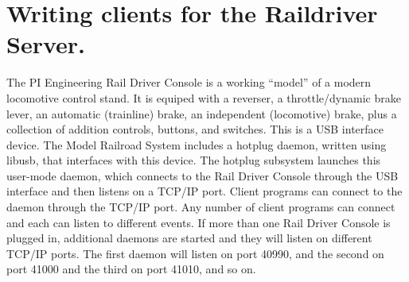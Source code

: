 
\chapter{Writing clients for the Raildriver Server.}
\label{chapt:rd:RaildriverServer}

The PI Engineering Rail Driver Console is a working ``model'' of a
modern locomotive control stand.  It is equiped with a reverser, a
throttle/dynamic brake lever, an automatic (trainline) brake, an
independent (locomotive) brake, plus a collection of addition controls,
buttons, and switches.  This is a USB interface device.  The Model
Railroad System includes a hotplug daemon, written using libusb, that
interfaces with this device.  The hotplug subsystem launches this
user-mode daemon, which connects to the Rail Driver Console through the
USB interface and then listens on a TCP/IP port.  Client programs can
connect to the daemon through the TCP/IP port.  Any number of client
programs can connect and each can listen to different events.  If more
than one Rail Driver Console is plugged in, additional daemons are
started and they will listen on different TCP/IP ports. The first daemon
will listen on port 40990, and the second on port 41000 and the third on
port 41010, and so on.

